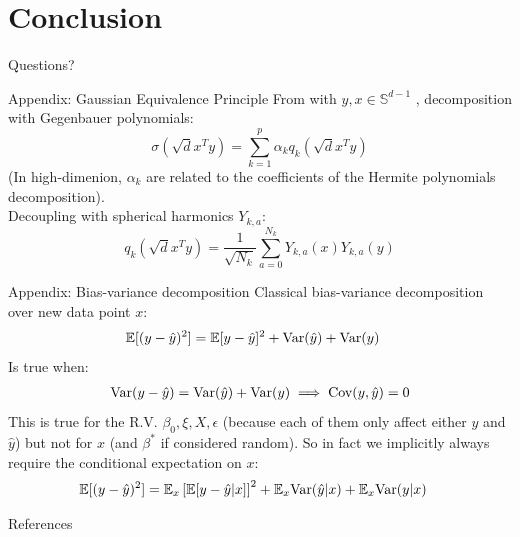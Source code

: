 \documentclass[10pt]{beamer}
\begin{document}
\section{Conclusion}


\begin{frame}[standout]
  Questions?
\end{frame}



\begin{frame}{Appendix: Gaussian Equivalence Principle}
  From \cite{lu2022equivalence,mei2020generalization} with $y,x \in \mathbb S^{d-1}$ , decomposition with Gegenbauer polynomials:
  \begin{equation*}
    \sigma(\sqrt{d} x^T y) = \sum_{k=1}^{p} \alpha_k q_k(\sqrt{d} x^T y)
  \end{equation*}
  (In high-dimenion, $\alpha_k$ are related to the coefficients of the Hermite polynomials decomposition).\\
  Decoupling with spherical harmonics $Y_{k,a}$:
  \begin{equation*}
    q_k(\sqrt{d} x^T y) = \frac{1}{\sqrt{N_k}} \sum_{a=0}^{N_k} Y_{k,a}(x) Y_{k,a}(y)
  \end{equation*}
\end{frame}
  


\begin{frame}{Appendix: Bias-variance decomposition}
  Classical bias-variance decomposition over new data point $x$:
  \begin{align}
    \mathbb E[(y - \hat y )^2] & = \mathbb E[y - \hat y]^2 + \text{Var}(\hat y) + \text{Var}(y)
  \end{align}
  Is true when:
  \begin{align}
    \text{Var}(y - \hat y) = \text{Var}(\hat y) + \text{Var}(y)
    \implies \text{Cov}(y, \hat y)=0
  \end{align}
  This is true for the R.V. $\beta_0, \xi, X, \epsilon$ (because each of them only affect either $y$ and $\hat y$) but not for $x$ (and $\beta^*$ if considered random). So in fact we implicitly always require the conditional expectation on $x$:
  \begin{align}
    \mathbb E[(y - \hat y )^2] & = \mathbb E_x\left[ \mathbb E[y - \hat y| x]\right]^2 + \mathbb E_x \text{Var}(\hat y | x) + \mathbb E_x \text{Var}(y | x)
  \end{align}
\end{frame}




\appendix

\begin{frame}{References}

  
  

\end{frame}
\end{document}
